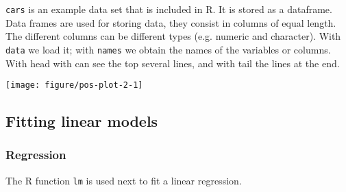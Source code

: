 \documentclass[paper=a4,10pt,div=17,headsepline,BCOR=12mm,twoside,open=right]{scrbook}\usepackage{knitr}
\begin{document}
\texttt{cars} is an example data set that is included in R. It is stored as a dataframe. Data frames are used for storing data, they consist in columns of equal length. The different columns can be different types (e.g. numeric and character). With \texttt{data} we load it; with \texttt{names} we obtain the names of the variables or columns. With head with can see the top several lines, and with tail the lines at the end.

\begin{knitrout}\footnotesize
{}\color{fgcolor}\begin{kframe}
\begin{alltt}
 \hlopt{~}  
\end{alltt}
\end{kframe}

{\centering \texttt{[image: figure/pos-plot-2-1]} 

}



\end{knitrout}

\subsection{Fitting linear models}

\subsubsection{Regression}

The R function \texttt{lm} is used next to fit a linear regression.
\end{document}
